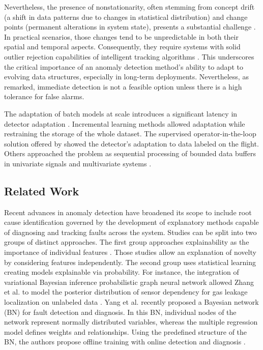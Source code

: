 Nevertheless, the presence of nonstationarity, often stemming from concept drift (a shift in data patterns due to changes in statistical distribution) and change points (permanent alterations in system state), presents a substantial challenge \citep{Salehi2018}. In practical scenarios, those changes tend to be unpredictable in both their spatial and temporal aspects. Consequently, they require systems with solid outlier rejection capabilities of intelligent tracking algorithms \citep{Barbosa2019162}. This underscores the critical importance of an anomaly detection method's ability to adapt to evolving data structures, especially in long-term deployments. Nevertheless, as \citep{Tartakovsky2013} remarked, immediate detection is not a feasible option unless there is a high tolerance for false alarms.

The adaptation of batch models at scale introduces a significant latency in detector adaptation \citep{Wu2021}. Incremental learning methods allowed adaptation while restraining the storage of the whole dataset. The supervised operator-in-the-loop solution offered by \citet{Pannu2012} showed the detector's adaptation to data labeled on the flight.
Others approached the problem as sequential processing of bounded data buffers in univariate signals \citep{Ahmad2017134} and multivariate systems \citep{Bosman201514}.

\subsection{Related Work}
Recent advances in anomaly detection have broadened its scope to include root cause identification governed by the development of explanatory methods capable of diagnosing and tracking faults across the system. Studies can be split into two groups of distinct approaches. The first group approaches explainability as the importance of individual features \citep{Carletti2019, Nguyen2019, Amarasinghe2018}. Those studies allow an explanation of novelty by considering features independently. The second group uses statistical learning creating models explainable via probability. For instance, the integration of variational Bayesian inference probabilistic graph neural network allowed Zhang et al. to model the posterior distribution of sensor dependency for gas leakage localization on unlabeled data \citep{ZHANG2023120542}. Yang et al. recently proposed a Bayesian network (BN) for fault detection and diagnosis. In this BN, individual nodes of the network represent normally distributed variables, whereas the multiple regression model defines weights and relationships. Using the predefined structure of the BN, the authors propose offline training with online detection and diagnosis \citep{Yang2022}.

